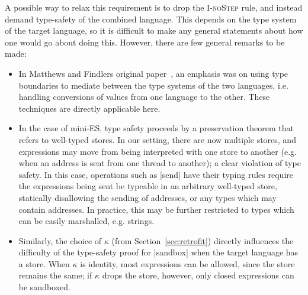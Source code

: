 A possible way to relax this requirement is to drop the \textsc{I-noStep}
rule, and instead demand type-safety of the combined language.  This
depends on the type system of the target language, so it is difficult to
make any general statements about how one would go about doing this.  However,
there are few general remarks to be made:

\begin{itemize}
    \item In Matthews and Findlers original
        paper~\cite{Matthews:2007:OSM:1190216.1190220}, an emphasis was
        on using type boundaries to mediate between the type systems of
        the two languages, i.e. handling conversions of values from
        one language to the other.  These techniques are directly applicable here.

    \item In the case of mini-ES, type safety proceeds by a preservation theorem
        that refers to well-typed stores.  In our setting, there are now multiple
        stores, and expressions may move from being interpreted with one store
        to another (e.g. when an address is sent from one thread to
        another); a clear violation of type safety.  In this case, operations
        such as |send| have their typing rules require
        the expressions being sent be typeable in an arbitrary well-typed store,
        statically disallowing the sending of addresses, or any types which
        may contain addresses.  In practice, this may be further restricted to
        types which can be easily marshalled, e.g. strings.

    \item Similarly, the choice of $\kappa$ (from Section~\ref{sec:retrofit}) directly
        influences the difficulty of the type-safety proof for
        |sandbox| when the target language has a store.  When
        $\kappa$ is identity, most expressions can be allowed, since the store
        remains the same; if $\kappa$ drops the store, however, only closed expressions
        can be sandboxed.
\end{itemize}

